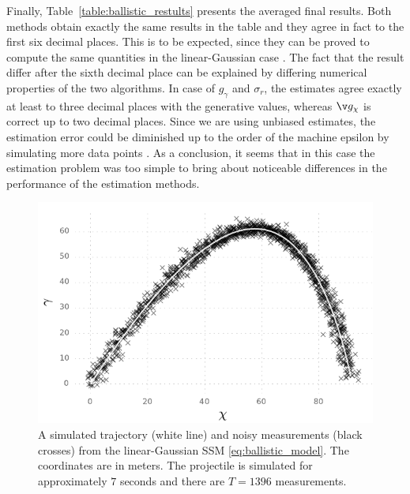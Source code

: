 Finally, Table~\ref{table:ballistic_restults} presents the averaged final
results. Both methods obtain exactly
the same results in the table and they agree in fact to the first six decimal places. 
This is to be expected, since they can be proved to compute the same quantities 
in the linear-Gaussian case . The fact that
the result differ after the sixth decimal place can be explained by differing
numerical properties of the two algorithms. In case of $g_\gamma$ and $\sigma_r$,
the estimates agree exactly at least to three decimal places with the generative
values, whereas $\g_\chi$ is correct up to two decimal places. Since we are using
unbiased estimates, the estimation error could be diminished up to the order of the machine
epsilon by simulating more data points .
As a conclusion, it seems that in this case the estimation problem was too simple to bring
about noticeable differences in the performance of the estimation methods.

\begin{figure}[htbp]%
    \centering%
    \includegraphics{img/ballistic_trajectory}%
	\caption{A simulated trajectory (white line) and noisy
	measurements (black crosses) from 
	the linear-Gaussian SSM \eqref{eq:ballistic_model}. 
   	The coordinates are in meters.
   	The projectile is simulated for approximately $7$
   	seconds and there are $T=1396$ measurements.
   	}\label{fig:ballistic2D_simulation}
 \end{figure}

